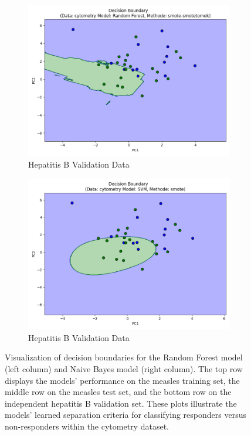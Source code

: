 \documentclass[12pt,a4paper]{report}
\begin{document}
\begin{figure}[h!]
    \vspace{1em}

    \begin{subfigure}[b]{0.49\textwidth}
        \centering
        \includegraphics[width=\textwidth]{images/val_decision_boundary_H.png} 
        \caption{Hepatitis B Validation Data} 
        \label{fig:val_decision_boundary_H}
    \end{subfigure}
    \hfill
    \begin{subfigure}[b]{0.49\textwidth}
        \centering
        \includegraphics[width=\linewidth]{images/val2_decision_boundary_H.png}
        \caption{Hepatitis B Validation Data} 
        \label{fig:val2_decision_boundary_H} 
    \end{subfigure}

    \caption[Decision Boundaries of Predictive Models Across Datasets]{Visualization of decision boundaries for the Random Forest model (left column) and Naive Bayes model (right column). The top row displays the models' performance on the measles training set, the middle row on the measles test set, and the bottom row on the independent hepatitis B validation set. These plots illustrate the models' learned separation criteria for classifying responders versus non-responders within the cytometry dataset.} 
    \label{fig:decision_boundary_validation} 
\end{figure}
\end{document}
